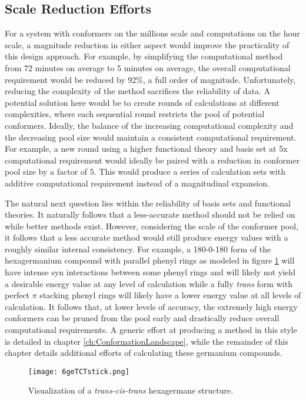 \subsection{Scale Reduction Efforts}

For a system with conformers on the millions scale and computations on the hour scale, a magnitude reduction in either aspect would improve the practicality of this design approach.
For example, by simplifying the computational method from 72 minutes on average to 5 minutes on average, the overall computational requirement would be reduced by 92\%, a full order of magnitude. 
Unfortunately, reducing the complexity of the method sacrifices the reliability of data.
A potential solution here would be to create rounds of calculations at different complexities, where each sequential round restricts the pool of potential conformers.
Ideally, the balance of the increasing computational complexity and the decreasing pool size would maintain a consistent computational requirement.
For example, a new round using a higher functional theory and basis set at 5x computational requirement would ideally be paired with a reduction in conformer pool size by a factor of 5.
This would produce a series of calculation sets with additive computational requirement instead of a magnitudinal expansion.

The natural next question lies within the reliability of basis sets and functional theories. 
It naturally follows that a less-accurate method should not be relied on while better methods exist. 
However, considering the scale of the conformer pool, it follows that a less accurate method would still produce energy values with a roughly similar internal consistency. 
For example, a 180-0-180 form of the hexagermanium compound with parallel phenyl rings as modeled in figure \ref{fig:6geTCT} will have intense syn interactions between some phenyl rings and will likely not yield a desirable energy value at any level of calculation while a fully \textit{trans} form with perfect $\pi$ stacking phenyl rings will likely have a lower energy value at all levels of calculation.
It follows that, at lower levels of accuracy, the extremely high energy conformers can be pruned from the pool early and drastically reduce overall computational requirements.
A generic effort at producing a method in this style is detailed in chapter \ref{ch:ConformationLandscape}, while the remainder of this chapter details additional efforts of calculating these germanium compounds.

\begin{figure}
	
	\centering
	
	\texttt{[image: 6geTCTstick.png]}
	
	\caption{Visualization of a \textit{trans-cis-trans} hexagermane structure.}
	
	\label{fig:6geTCT}
	
\end{figure}

